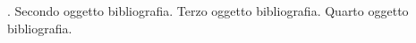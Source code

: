 \documentclass[12pt,a4paper,openright,twoside]{report}
\begin{document}








\begin{thebibliography}{90}             %

    \rhead[\fancyplain{}{\bfseries \leftmark}]{\fancyplain{}{\bfseries
    \thepage}}

     .
     Secondo oggetto bibliografia.
     Terzo oggetto bibliografia.
     Quarto oggetto bibliografia.

\end{thebibliography}
\end{document}
